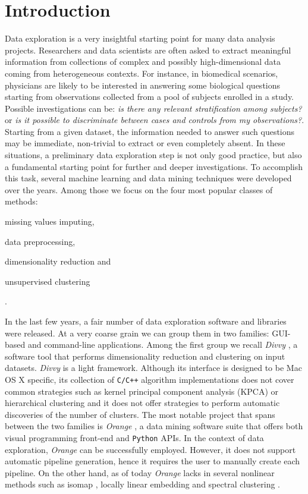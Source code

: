 \documentclass[twoside,11pt]{article}
\makeatletter
\newcommand{\py}{\texttt{Python}\@\xspace}
\makeatother
\begin{document}
\section{Introduction}\label{sec:intro}
Data exploration is a very insightful starting point for many data analysis projects. Researchers and data scientists are often asked to extract meaningful information from collections of complex and possibly high-dimensional data coming from heterogeneous contexts. For instance, in biomedical scenarios, physicians are likely to be interested in answering some biological questions starting from observations collected from a pool of subjects enrolled in a study. Possible investigations can be: \emph{is there any relevant stratification among subjects?} or \emph{is it possible to discriminate between cases and controls from my observations?}. Starting from a given dataset, the information needed to answer such questions may be immediate, non-trivial to extract or even completely absent.
In these situations, a preliminary data exploration step is not only good practice, but also a fundamental starting point for further and deeper investigations. To accomplish this task, several machine learning and data mining techniques were developed over the years. Among those we focus on the four most popular classes of methods: \begin{enumerate*}[label=(\roman*)]
  \item missing values imputing,
  \item data preprocessing,
  \item dimensionality reduction and
  \item unsupervised clustering
\end{enumerate*}.

In the last few years, a fair number of data exploration software and libraries were released. At a very coarse grain we can group them in two families: GUI-based and command-line applications. 
Among the first group we recall \emph{Divvy} \citep{lewis2013divvy}, a software tool that performs dimensionality reduction and clustering on input datasets. \emph{Divvy} is a light framework. Although its interface is designed to be Mac OS X specific, 
its collection of \texttt{C/C++} algorithm implementations does not cover common strategies such as kernel principal component analysis (KPCA) \citep{scholkopf1997kernel} or hierarchical clustering \citep{friedman2001elements} and it does not offer strategies to perform automatic discoveries of the number of clusters. The most notable project that spans between the two families is \emph{Orange} \citep{demvsar2013orange}, a data mining software suite that offers both visual programming front-end and \py APIs. In the context of data exploration, \emph{Orange} can be successfully employed. However, it does not support automatic pipeline generation, hence it requires the user to manually create each pipeline. On the other hand, as of today \emph{Orange} lacks in several nonlinear methods such as isomap \citep{tenenbaum2000global}, locally linear embedding \citep{roweis2000nonlinear} and spectral clustering \citep{shi2000normalized}.
\end{document}
